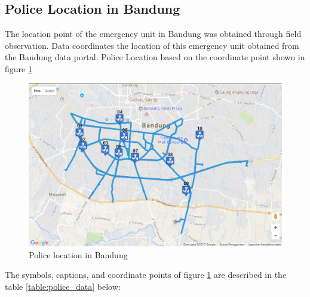 \subsection{Police Location in Bandung}
The location point of the emergency unit in Bandung was obtained through field observation. Data coordinates the location of this emergency unit obtained from the Bandung data portal. Police Location based on the coordinate point shown in figure \ref{fig:police_location}

\begin{figure}[H]
    \centering
    \includegraphics[scale=0.6]{data_coll3.png}
    \caption{Police location in Bandung}
    \label{fig:police_location}
\end{figure}

The symbols, captions, and coordinate points of figure \ref{fig:police_location} are described in the table \ref{table:police_data} below:

